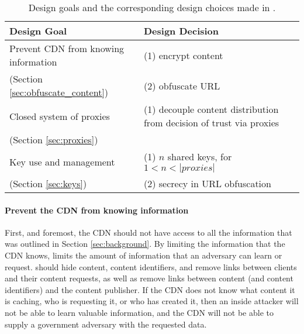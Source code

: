 \begin{table*}[t!]
\centering
\begin{tabular}{| l | l |} 
 \hline
 {\bf Design Goal} & {\bf Design Decision} \\ 
 \hline\hline
 Prevent CDN from knowing information & (1) encrypt content   \\ 
  (Section \ref{sec:obfuscate_content})                          & (2) obfuscate URL \\ \hline
 Closed system of proxies & (1) decouple content distribution from decision of trust via proxies  \\ 
  (Section \ref{sec:proxies})  & \\ \hline
 Key use and management & (1) $n$ shared keys, for $1 < n < |proxies|$ \\ 
   (Section \ref{sec:keys})                     & (2) secrecy in URL obfuscation \\ 
 \hline
\end{tabular}
\caption{Design goals and the corresponding design choices made in \system{}.}
\label{tab:design_goals}
\end{table*}

\paragraph{Prevent the CDN from knowing information} First, and foremost, the CDN 
should not have access to all the information that was outlined 
in Section \ref{sec:background}.  By limiting the information that the CDN knows, \system{} limits 
the amount of information that an adversary can learn or request.  \system{} should hide 
content, content identifiers, and remove links between clients and their content requests, as well 
as remove links between content (and content identifiers) and the content publisher.  If the CDN 
does not know what content it is caching, who is requesting it, or who has created it, then an 
inside attacker will not be able to learn valuable information, and the CDN will not be able to supply 
a government adversary with the requested data.

